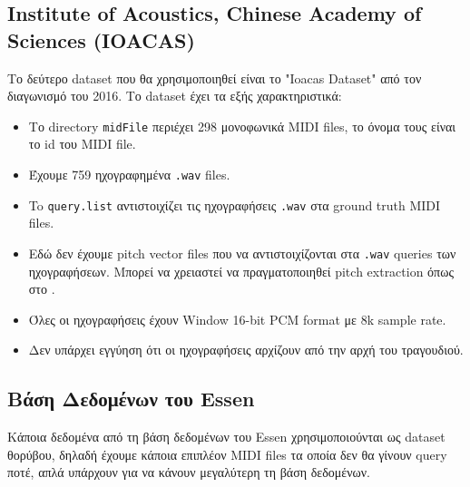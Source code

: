 \subsection{Institute of Acoustics, Chinese Academy of Sciences (IOACAS)}
Το δεύτερο dataset που θα χρησιμοποιηθεί είναι το "Ioacas Dataset" \cite{IOACAS-dataset} από τον διαγωνισμό του 2016. Το dataset έχει τα εξής χαρακτηριστικά:
\begin{itemize}
\item Το directory \texttt{midFile} περιέχει 298 μονοφωνικά MIDI files, το όνομα τους είναι το id του MIDI file.
\item Έχουμε 759 ηχογραφημένα \texttt{.wav} files.
\item To \texttt{query.list} αντιστοιχίζει τις ηχογραφήσεις \texttt{.wav} στα ground truth MIDI files.
\item Εδώ δεν έχουμε pitch vector files που να αντιστοιχίζονται στα \texttt{.wav} queries των ηχογραφήσεων.
Μπορεί να χρειαστεί να πραγματοποιηθεί pitch extraction όπως στο \cite{park2015query}.
\item Όλες οι ηχογραφήσεις έχουν Window 16-bit PCM format με 8k sample rate.
\item Δεν υπάρχει εγγύηση ότι οι ηχογραφήσεις αρχίζουν από την αρχή του τραγουδιού.
\end{itemize}

\subsection{Βάση Δεδομένων του Essen}
Κάποια δεδομένα από τη βάση δεδομένων του Essen\cite{esac-data} χρησιμοποιούνται
 ως dataset θορύβου, δηλαδή έχουμε κάποια επιπλέον MIDI files τα οποία δεν θα
 γίνουν query ποτέ, απλά υπάρχουν για να κάνουν μεγαλύτερη τη βάση δεδομένων. 
